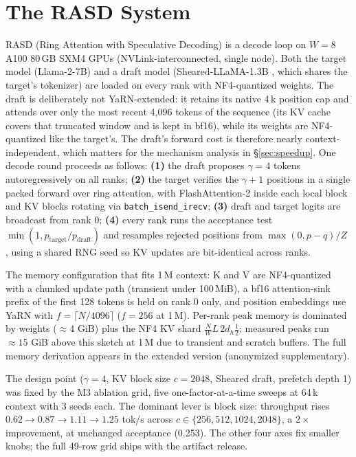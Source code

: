 \documentclass{article}
\begin{document}
\section{The RASD System}
\label{sec:system}

RASD (Ring Attention with Speculative Decoding) is a decode loop
on $W=8$ A100 80\,GB SXM4 GPUs (NVLink-interconnected, single
node). Both the target model (Llama-2-7B) and a draft model
(Sheared-LLaMA-1.3B \citep{xia2023sheared}, which shares the
target's tokenizer) are loaded on every rank with NF4-quantized
weights. The draft is deliberately not YaRN-extended: it retains
its native 4\,k position cap and attends over only the most
recent 4{,}096 tokens of the sequence (its KV cache covers that
truncated window and is kept in bf16), while its weights are
NF4-quantized like the target's. The draft's forward cost is
therefore nearly context-independent, which matters for the
mechanism analysis in \S\ref{sec:speedup}. One decode round proceeds as follows: \textbf{(1)} the
draft proposes $\gamma=4$ tokens autoregressively on all ranks;
\textbf{(2)} the target verifies the $\gamma+1$ positions in a
single packed forward over ring attention, with FlashAttention-2
inside each local block and KV blocks rotating via
\texttt{batch\_isend\_irecv}; \textbf{(3)} draft and target logits
are broadcast from rank 0; \textbf{(4)} every rank runs the
acceptance test $\min(1, p_{\mathrm{target}}/p_{\mathrm{draft}})$
and resamples rejected positions from
$\max(0, p-q)/Z$ \citep{leviathan2023fast}, using a shared RNG seed
so KV updates are bit-identical across ranks.

The memory configuration that fits 1\,M context: K and V are
NF4-quantized with a chunked update path (transient under
100\,MiB), a bf16 attention-sink prefix of the first 128 tokens
\citep{xiao2024streamingllm} is held on rank 0 only, and position
embeddings use YaRN with $f = \lceil N/4096 \rceil$ ($f=256$ at
1\,M). Per-rank peak memory is dominated by weights (${\approx}4$
GiB) plus the NF4 KV shard $\tfrac{N}{W} L\, 2 d_h \tfrac{1}{2}$;
measured peaks run ${\approx}15$ GiB above this sketch at 1\,M due
to transient and scratch buffers. The full memory derivation
appears in the extended version (anonymized supplementary).

The design point ($\gamma=4$, KV block size $c=2048$, Sheared
draft, prefetch depth 1) was fixed by the M3 ablation grid, five
one-factor-at-a-time sweeps at 64\,k context with 3 seeds each.
The dominant lever is block size: throughput rises
$0.62 \to 0.87 \to 1.11 \to 1.25$ tok/s across
$c \in \{256, 512, 1024, 2048\}$, a $2\times$ improvement, at
unchanged acceptance (0.253). The other four axes fix smaller
knobs; the full 49-row grid ships with the artifact release.
\end{document}
